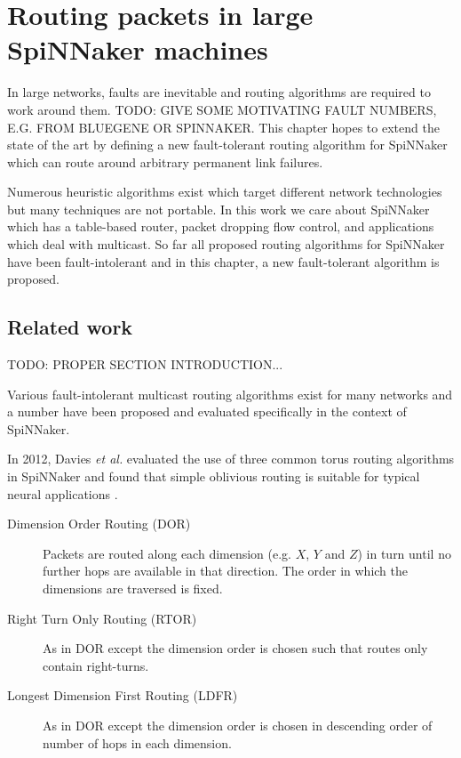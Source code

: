 \chapter{Routing packets in large SpiNNaker machines}
	
	In large networks, faults are inevitable and routing algorithms are required
	to work around them. TODO: GIVE SOME MOTIVATING FAULT NUMBERS, E.G. FROM
	BLUEGENE OR SPINNAKER. This chapter hopes to extend the state of the art by
	defining a new fault-tolerant routing algorithm for SpiNNaker which can route
	around arbitrary permanent link failures.
	
	Numerous heuristic algorithms exist which target different network
	technologies but many techniques are not portable. In this work we care
	about SpiNNaker which has a table-based router, packet dropping flow control,
	and applications which deal with multicast. So far all proposed routing
	algorithms for SpiNNaker have been fault-intolerant and in this chapter, a
	new fault-tolerant algorithm is proposed.
	
	\section{Related work}
		
		TODO: PROPER SECTION INTRODUCTION...
		
		Various fault-intolerant multicast routing algorithms exist for many
		networks and a number have been proposed and evaluated specifically in the
		context of SpiNNaker.
		
		In 2012, Davies \emph{et al.} evaluated the use of three common torus
		routing algorithms in SpiNNaker and found that simple oblivious routing is
		suitable for typical neural applications \cite{davies12}.
		
		\begin{description}
			
			\item[Dimension Order Routing (DOR)] Packets are routed along each
			dimension (e.g. $X$, $Y$ and $Z$) in turn until no further hops are
			available in that direction.  The order in which the dimensions are
			traversed is fixed.
			
			\item[Right Turn Only Routing (RTOR)] As in DOR except the dimension
			order is chosen such that routes only contain right-turns.
			
			\item[Longest Dimension First Routing (LDFR)] As in DOR except the
			dimension order is chosen in descending order of number of hops in each
			dimension.
			
		\end{description}
		
